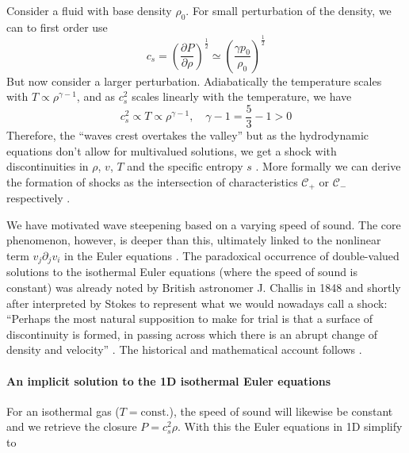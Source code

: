 
Consider a fluid with base density $\rho_0$. For small perturbation of the density, we can to first order
use
\begin{equation}
    c_s = \left( \frac{\partial P}{\partial \rho} \right)^{\frac{1}{2}} \simeq \left(\frac{\gamma p_0}{\rho_0}\right)^{\frac{1}{2}}
\end{equation}
But now consider a larger perturbation. Adiabatically the temperature scales with $T \propto \rho^{\gamma - 1}$, and as $c_s^2$ scales
linearly with the temperature, we have
\begin{equation}
    c_s^2 \propto T \propto \rho^{\gamma - 1}, \quad \gamma - 1 = \frac{5}{3} - 1 > 0
\end{equation}
Therefore, the “waves crest overtakes the valley” but as the hydrodynamic equations don't allow for multivalued solutions, we get a shock
with discontinuities in $\rho$, $v$, $T$ and the specific entropy $s$ \citep[Sec. 4.3.1]{sormani22}. More formally
we can derive the formation of shocks as the intersection of characteristics $\mathcal{C}_{+}$ or $\mathcal{C}_{-}$
respectively \citep[Sec. 4.5.1]{tong}.

We have motivated wave steepening based on a varying speed of sound. The core
phenomenon, however, is deeper than this, ultimately linked to the nonlinear term
$v_j\partial_j v_i$ in the Euler equations \citep[Sec. 2.4.2]{hahn19}.
The paradoxical occurrence of double-valued solutions to the isothermal Euler equations
(where the speed of sound is constant) was already noted by British astronomer 
J. Challis in 1848 \citep{challis48} and shortly after interpreted by Stokes to represent what we would
nowadays call a shock: \enquote{Perhaps the
most natural supposition to make for trial is that a surface of discontinuity is formed,
in passing across which there is an abrupt change of density and velocity} \citep{stokes48}.
The historical and mathematical account follows \cite{Dafermos2000}.

\paragraph{An implicit solution to the 1D isothermal Euler equations} For an isothermal gas ($T = \text{const.}$), the speed of sound will likewise be constant and we retrieve
the closure $P = c_s^2 \rho$. With this the Euler equations in 1D simplify to

